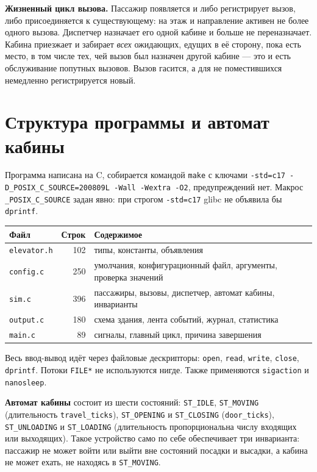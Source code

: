 \documentclass[12pt,a4paper]{article}
\begin{document}
\textbf{Жизненный цикл вызова.} Пассажир появляется и либо регистрирует
вызов, либо присоединяется к существующему: на этаж и направление активен
не более одного вызова. Диспетчер назначает его одной кабине и больше не
переназначает. Кабина приезжает и забирает \emph{всех} ожидающих,
едущих в её сторону, пока есть место, в том числе тех, чей вызов был
назначен другой кабине --- это и есть обслуживание попутных вызовов. Вызов
гасится, а для не поместившихся немедленно регистрируется новый.

\section{Структура программы и автомат кабины}

Программа написана на C, собирается командой \verb|make| с ключами
\verb|-std=c17 -D_POSIX_C_SOURCE=200809L -Wall -Wextra -O2|, предупреждений
нет. Макрос \verb|_POSIX_C_SOURCE| задан явно: при строгом \verb|-std=c17|
glibc не объявила бы \verb|dprintf|.

\begin{center}
\begin{tabular}{@{}p{28mm}r p{95mm}@{}}
\textbf{Файл} & \textbf{Строк} & \textbf{Содержимое} \\
\hline
\verb|elevator.h| & 102 & типы, константы, объявления \\
\verb|config.c| & 250 & умолчания, конфигурационный файл, аргументы,
проверка значений \\
\verb|sim.c| & 396 & пассажиры, вызовы, диспетчер, автомат кабины,
инварианты \\
\verb|output.c| & 180 & схема здания, лента событий, журнал, статистика \\
\verb|main.c| & 89 & сигналы, главный цикл, причина завершения \\
\hline
\end{tabular}
\end{center}

Весь ввод-вывод идёт через файловые дескрипторы: \verb|open|,
\verb|read|, \verb|write|, \verb|close|, \verb|dprintf|. Потоки
\verb|FILE*| не используются нигде. Также применяются \verb|sigaction|
и \verb|nanosleep|.

\textbf{Автомат кабины} состоит из шести состояний: \verb|ST_IDLE|,
\verb|ST_MOVING| (длительность \verb|travel_ticks|), \verb|ST_OPENING| и
\verb|ST_CLOSING| (\verb|door_ticks|), \verb|ST_UNLOADING| и
\verb|ST_LOADING| (длительность пропорциональна числу входящих или
выходящих). Такое устройство само по себе обеспечивает три инварианта:
пассажир не может войти или выйти вне состояний посадки и высадки, а
кабина не может ехать, не находясь в \verb|ST_MOVING|.
\end{document}
